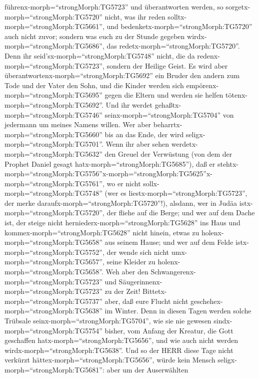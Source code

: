 führenx-morph=``strongMorph:TG5723'' und überantworten werden, so
sorgetx-morph=``strongMorph:TG5720'' nicht, was ihr reden
solltx-morph=``strongMorph:TG5661'', und
bedenketx-morph=``strongMorph:TG5720'' auch nicht zuvor; sondern was
euch zu der Stunde gegeben wirdx-morph=``strongMorph:TG5686'', das
redetx-morph=``strongMorph:TG5720''. Denn ihr
seid'sx-morph=``strongMorph:TG5748'' nicht, die da
redenx-morph=``strongMorph:TG5723'', sondern der Heilige Geist.
 Es wird aber überantwortenx-morph=``strongMorph:TG5692''
ein Bruder den andern zum Tode und der Vater den Sohn, und die Kinder
werden sich empörenx-morph=``strongMorph:TG5695'' gegen die Eltern und
werden sie helfen tötenx-morph=``strongMorph:TG5692''.  Und
ihr werdet gehaßtx-morph=``strongMorph:TG5746''
seinx-morph=``strongMorph:TG5704'' von jedermann um meines Namens
willen. Wer aber beharrtx-morph=``strongMorph:TG5660'' bis an das Ende,
der wird seligx-morph=``strongMorph:TG5701''.  Wenn ihr
aber sehen werdetx-morph=``strongMorph:TG5632'' den Greuel der
Verwüstung (von dem der Prophet Daniel gesagt
hatx-morph=``strongMorph:TG5685''), daß er
stehtx-morph=``strongMorph:TG5756''\textbar x-morph=``strongMorph:TG5625''x-morph=``strongMorph:TG5761'',
wo er nicht sollx-morph=``strongMorph:TG5748'' (wer es
liestx-morph=``strongMorph:TG5723'', der merke
daraufx-morph=``strongMorph:TG5720''!), alsdann, wer in Judäa
istx-morph=``strongMorph:TG5720'', der fliehe auf die Berge;
 und wer auf dem Dache ist, der steige nicht
herniederx-morph=``strongMorph:TG5628'' ins Haus und
kommex-morph=``strongMorph:TG5628'' nicht hinein, etwas zu
holenx-morph=``strongMorph:TG5658'' aus seinem Hause;  und
wer auf dem Felde istx-morph=``strongMorph:TG5752'', der wende sich
nicht umx-morph=``strongMorph:TG5657'', seine Kleider zu
holenx-morph=``strongMorph:TG5658''.  Weh aber den
Schwangerenx-morph=``strongMorph:TG5723'' und
Säugerinnenx-morph=``strongMorph:TG5723'' zu der Zeit! 
Bittetx-morph=``strongMorph:TG5737'' aber, daß eure Flucht nicht
geschehex-morph=``strongMorph:TG5638'' im Winter.  Denn in
diesen Tagen werden solche Trübsale seinx-morph=``strongMorph:TG5704'',
wie sie nie gewesen sindx-morph=``strongMorph:TG5754'' bisher, vom
Anfang der Kreatur, die Gott geschaffen
hatx-morph=``strongMorph:TG5656'', und wie auch nicht werden
wirdx-morph=``strongMorph:TG5638''.  Und so der HERR diese
Tage nicht verkürzt hättex-morph=``strongMorph:TG5656'', würde kein
Mensch seligx-morph=``strongMorph:TG5681'': aber um der Auserwählten
